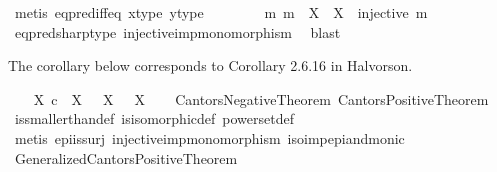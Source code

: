 \begin{isabellebody}
\ {\isacharparenleft}{\kern0pt}metis\ eq{\isacharunderscore}{\kern0pt}pred{\isacharunderscore}{\kern0pt}iff{\isacharunderscore}{\kern0pt}eq\ x{\isacharunderscore}{\kern0pt}type\ y{\isacharunderscore}{\kern0pt}type{\isacharparenright}{\kern0pt}\isanewline
\ \ \isamarkupfalse%
\isanewline
\ \ \isamarkupfalse%
\ \isamarkupfalse%
\ {\isachardoublequoteopen}{\isasymexists}m{\isachardot}{\kern0pt}\ m\ {\isacharcolon}{\kern0pt}\ X\ {\isasymrightarrow}\ {\isasymOmega}\isactrlbsup X\isactrlesup \ {\isasymand}\ injective\ m{\isachardoublequoteclose}\isanewline
\ \ \ \ \isamarkupfalse%
\ eq{\isacharunderscore}{\kern0pt}pred{\isacharunderscore}{\kern0pt}sharp{\isacharunderscore}{\kern0pt}type\ injective{\isacharunderscore}{\kern0pt}imp{\isacharunderscore}{\kern0pt}monomorphism\ \isamarkupfalse%
\ blast\isanewline
{}\isamarkupfalse%
%
\endisatagproof
{\isafoldproof}%
%
\isadelimproof
%
\endisadelimproof
%
\begin{isamarkuptext}%
The corollary below corresponds to Corollary 2.6.16 in Halvorson.%
\end{isamarkuptext}\isamarkuptrue%
\isamarkupfalse%
\ \isanewline
\ \ {\isachardoublequoteopen}X\ {\isasymle}\isactrlsub c\ {\isasymP}\ X\ {\isasymand}\ {\isasymnot}\ {\isacharparenleft}{\kern0pt}X\ {\isasymcong}\ {\isasymP}\ X{\isacharparenright}{\kern0pt}{\isachardoublequoteclose}\isanewline
%
\isadelimproof
\ \ %
\endisadelimproof
%
\isatagproof
{}\isamarkupfalse%
\ Cantors{\isacharunderscore}{\kern0pt}Negative{\isacharunderscore}{\kern0pt}Theorem\ Cantors{\isacharunderscore}{\kern0pt}Positive{\isacharunderscore}{\kern0pt}Theorem\isanewline
\ \ \isamarkupfalse%
\ is{\isacharunderscore}{\kern0pt}smaller{\isacharunderscore}{\kern0pt}than{\isacharunderscore}{\kern0pt}def\ is{\isacharunderscore}{\kern0pt}isomorphic{\isacharunderscore}{\kern0pt}def\ powerset{\isacharunderscore}{\kern0pt}def\isanewline
\ \ \isamarkupfalse%
\ {\isacharparenleft}{\kern0pt}metis\ epi{\isacharunderscore}{\kern0pt}is{\isacharunderscore}{\kern0pt}surj\ injective{\isacharunderscore}{\kern0pt}imp{\isacharunderscore}{\kern0pt}monomorphism\ iso{\isacharunderscore}{\kern0pt}imp{\isacharunderscore}{\kern0pt}epi{\isacharunderscore}{\kern0pt}and{\isacharunderscore}{\kern0pt}monic{\isacharparenright}{\kern0pt}%
\endisatagproof
{\isafoldproof}%
%
\isadelimproof
\isanewline
%
\endisadelimproof
\isanewline
{}\isamarkupfalse%
\ Generalized{\isacharunderscore}{\kern0pt}Cantors{\isacharunderscore}{\kern0pt}Positive{\isacharunderscore}{\kern0pt}Theorem{\isacharcolon}{\kern0pt}\isanewline

\end{isabellebody}
